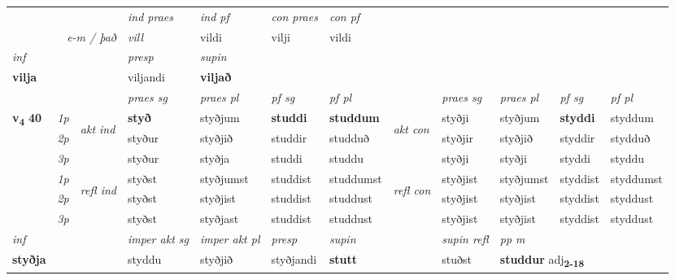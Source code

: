 \begin{longtable}[l]{X>{\footnotesize\itshape}llXXXXlXXXX}
   && &  \textit{ind praes} & \textit{ind pf} & \textit{con praes} & \textit{con pf} \\*
\multicolumn{3}{r}{\textit{e-m / það}} & vill & vildi & vilji & vildi \\*

\cmidrule{4-7}
   {\textit{inf}} & &     & \textit{presp} & \textit{supin}   \\*
  {\textbf{vilja}} & &     & viljandi &  \textbf{viljað}   \\*

\midrule

 & &   & \textit{praes sg}  & \textit{praes pl}    & \textit{ pf sg} & \textit{pf pl} & & \textit{praes sg}  & \textit{praes pl}    & \textit{pf sg} & \textit{pf pl }  \\ \cmidrule{4-7} \cmidrule{9-12}
 \multirow{2}{*}{{{\textbf{v{\textsubscript{4}}} \Large{\textbf{40}}}}}  & 1p & \multirow{3}{*}{\begin{turn}{90}\textit{akt ind}\end{turn}} & \textbf{styð} & styðjum & \textbf{studdi} & \textbf{studdum} & \multirow{3}{*}{\begin{turn}{90}\textit{akt con}\end{turn}} &styðji & styðjum & \textbf{styddi} & styddum\\*
 & 2p &  &  styður  & styðjið & studdir & studduð & & styðjir & styðjið & styddir & stydduð \\*
 & 3p &  & styður & styðja & studdi & studdu & & styðji & styðji& styddi & styddu \\*
\cmidrule{4-7} \cmidrule{9-12}
 & 1p & \multirow{3}{*}{\begin{turn}{90}\textit{refl ind}\end{turn}}  & styðst & styðjumst & studdist & studdumst & \multirow{3}{*}{\begin{turn}{90}\textit{refl con}\end{turn}}  &styðjist & styðjumst & styddist & styddumst \\*
 & 2p &  & styðst & styðjist & studdist & studdust & &styðjist & styðjist & styddist & styddust \\*
 & 3p  & & styðst & styðjast & studdist & studdust & & styðjist & styðjist& styddist & styddust \\*
\cmidrule{4-7} \cmidrule{9-12}

   {\textit{inf}} & &  & \textit{imper akt sg} & \textit{imper akt pl}   & \textit{presp} & \textit{supin} && \textit{supin refl} & \textit{pp m} \\*
  {\textbf{styðja}} & && styddu  & styðjið   & styðjandi &  \textbf{stutt} && stuðst & \multicolumn{2}{l}{\textbf{studdur} adj\textbf{\textsubscript{2-18}}} \\*


\end{longtable}
